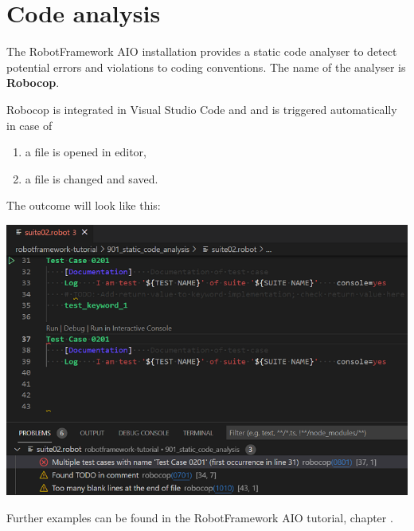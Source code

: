 %
%
%
\chapter{Code analysis}

The RobotFramework AIO installation provides a static code analyser to detect potential errors and violations to coding conventions.
The name of the analyser is \textbf{Robocop}.

Robocop is integrated in Visual Studio Code and and is triggered automatically in case of
\begin{enumerate}
   \item a file is opened in editor,
   \item a file is changed and saved.
\end{enumerate}

The outcome will look like this:

\includegraphics{./include/graphics/code_analysis/Overview}

Further examples can be found in the RobotFramework AIO tutorial, chapter .

